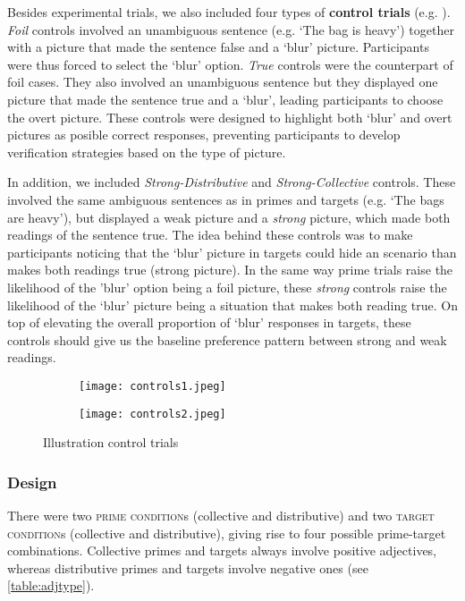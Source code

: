 \documentclass[a4paper, 11pt]{article}
\begin{document}
Besides experimental trials, we also included four types of \textbf{control trials} (e.g. ). \textit{Foil} controls involved an unambiguous sentence (e.g. `The bag is heavy') together with a picture that made the sentence false and a `blur' picture. Participants were thus forced to select the `blur' option. \emph{True} controls were the counterpart of foil cases. They also involved an unambiguous sentence but they displayed one picture that made the sentence true and a `blur', leading participants to choose the overt picture. 
These controls were designed to highlight both `blur' and overt pictures as posible correct responses, preventing participants to develop verification strategies based on the type of picture. 

In addition, we included \textit{Strong-Distributive} and \textit{Strong-Collective} controls. These involved the same ambiguous sentences as in primes and targets (e.g. `The bags are heavy'), but displayed a weak picture and a \emph{strong} picture, which made both readings of the sentence true. The idea behind these controls was to make participants noticing that the `blur' picture in targets could hide an scenario than makes both readings true (strong picture). In the same way prime trials raise the likelihood of the 'blur' option being a foil picture, these \textit{strong} controls raise the likelihood of the `blur' picture being a situation that makes both reading true. On top of elevating the overall proportion  of `blur' responses in targets, these controls should give us the baseline preference pattern between strong and weak readings. 

\begin{figure}[h!]
  \centering
  \begin{subfigure}[b]{0.8\textwidth}
    \texttt{[image: controls1.jpeg]}
     \end{subfigure}
    
      \begin{subfigure}[b]{0.8\textwidth}
    \texttt{[image: controls2.jpeg]}
      \end{subfigure}
      \caption{Illustration control trials}
      \label{fig.example.controls}
\end{figure}

\subsubsection{Design}
There were two \textsc{prime condition}s (collective and distributive) and two \textsc{target condition}s (collective and distributive), giving rise to four possible prime-target combinations. Collective primes and targets always involve positive adjectives, whereas distributive primes and targets involve negative ones (see \ref{table:adjtype}).
\end{document}
